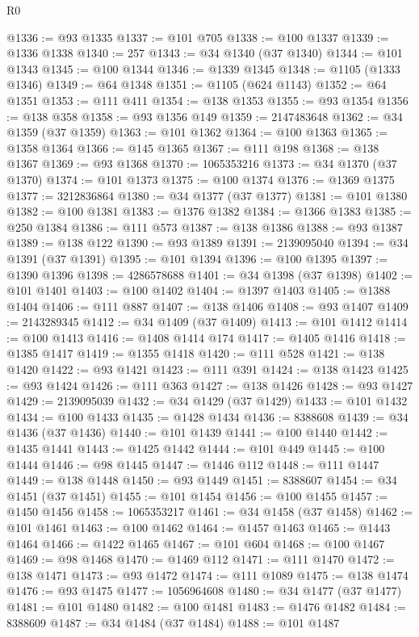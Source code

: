 \begin{lexlean}{R0}
\begin{coremodule}
@1336 := @93 @1335
@1337 := @101 @705
@1338 := @100 @1337
@1339 := @1336 @1338
@1340 := 257
@1343 := @34 @1340 (@37 @1340)
@1344 := @101 @1343
@1345 := @100 @1344
@1346 := @1339 @1345
@1348 := @1105 (@1333 @1346)
@1349 := @64 @1348
@1351 := @1105 (@624 @1143)
@1352 := @64 @1351
@1353 := @111 @411
@1354 := @138 @1353
@1355 := @93 @1354
@1356 := @138 @358
@1358 := @93 @1356 @149
@1359 := 2147483648
@1362 := @34 @1359 (@37 @1359)
@1363 := @101 @1362
@1364 := @100 @1363
@1365 := @1358 @1364
@1366 := @145 @1365
@1367 := @111 @198
@1368 := @138 @1367
@1369 := @93 @1368
@1370 := 1065353216
@1373 := @34 @1370 (@37 @1370)
@1374 := @101 @1373
@1375 := @100 @1374
@1376 := @1369 @1375
@1377 := 3212836864
@1380 := @34 @1377 (@37 @1377)
@1381 := @101 @1380
@1382 := @100 @1381
@1383 := @1376 @1382
@1384 := @1366 @1383
@1385 := @250 @1384
@1386 := @111 @573
@1387 := @138 @1386
@1388 := @93 @1387
@1389 := @138 @122
@1390 := @93 @1389
@1391 := 2139095040
@1394 := @34 @1391 (@37 @1391)
@1395 := @101 @1394
@1396 := @100 @1395
@1397 := @1390 @1396
@1398 := 4286578688
@1401 := @34 @1398 (@37 @1398)
@1402 := @101 @1401
@1403 := @100 @1402
@1404 := @1397 @1403
@1405 := @1388 @1404
@1406 := @111 @887
@1407 := @138 @1406
@1408 := @93 @1407
@1409 := 2143289345
@1412 := @34 @1409 (@37 @1409)
@1413 := @101 @1412
@1414 := @100 @1413
@1416 := @1408 @1414 @174
@1417 := @1405 @1416
@1418 := @1385 @1417
@1419 := @1355 @1418
@1420 := @111 @528
@1421 := @138 @1420
@1422 := @93 @1421
@1423 := @111 @391
@1424 := @138 @1423
@1425 := @93 @1424
@1426 := @111 @363
@1427 := @138 @1426
@1428 := @93 @1427
@1429 := 2139095039
@1432 := @34 @1429 (@37 @1429)
@1433 := @101 @1432
@1434 := @100 @1433
@1435 := @1428 @1434
@1436 := 8388608
@1439 := @34 @1436 (@37 @1436)
@1440 := @101 @1439
@1441 := @100 @1440
@1442 := @1435 @1441
@1443 := @1425 @1442
@1444 := @101 @449
@1445 := @100 @1444
@1446 := @98 @1445
@1447 := @1446 @112
@1448 := @111 @1447
@1449 := @138 @1448
@1450 := @93 @1449
@1451 := 8388607
@1454 := @34 @1451 (@37 @1451)
@1455 := @101 @1454
@1456 := @100 @1455
@1457 := @1450 @1456
@1458 := 1065353217
@1461 := @34 @1458 (@37 @1458)
@1462 := @101 @1461
@1463 := @100 @1462
@1464 := @1457 @1463
@1465 := @1443 @1464
@1466 := @1422 @1465
@1467 := @101 @604
@1468 := @100 @1467
@1469 := @98 @1468
@1470 := @1469 @112
@1471 := @111 @1470
@1472 := @138 @1471
@1473 := @93 @1472
@1474 := @111 @1089
@1475 := @138 @1474
@1476 := @93 @1475
@1477 := 1056964608
@1480 := @34 @1477 (@37 @1477)
@1481 := @101 @1480
@1482 := @100 @1481
@1483 := @1476 @1482
@1484 := 8388609
@1487 := @34 @1484 (@37 @1484)
@1488 := @101 @1487

\end{coremodule}
\end{lexlean}
